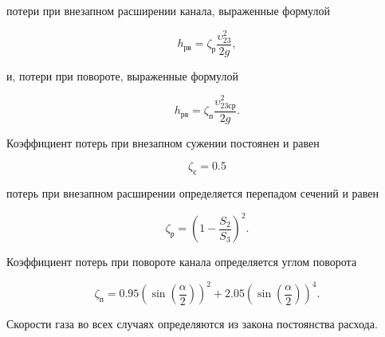 потери при внезапном расширении канала, выраженные формулой

\begin{equation}
    \label{eqn:ExpansionLosses}
    h_\text{рв}=\zeta_\text{р} \dfrac{\upsilon_{23}^2}{2g},
\end{equation}

и, потери при повороте, выраженные формулой

\begin{equation}
    \label{eqn:RotationLosses}
    h_\text{рв}=\zeta_\text{п} \dfrac{\upsilon_{23\text{ср}}^2}{2g}.
\end{equation}

Коэффициент потерь при внезапном сужении постоянен и равен

\begin{equation}
    \label{eqn:ConstrictionLossesCoef}
    \zeta_\text{с} = 0.5
\end{equation}

потерь при внезапном расширении определяется перепадом сечений и равен

\begin{equation}
    \label{eqn:ExpansionLossesCoef}
    \zeta_\text{р}=(1-\dfrac{S_{2}}{S_{3}})^2.
\end{equation}

Коэффициент потерь при повороте канала определяется углом поворота

\begin{equation}
    \label{eqn:RotationLossesCoef}
    \zeta_\text{п}=0.95 (\sin(\dfrac{\alpha}{2}))^2 + 2.05(\sin(\dfrac{\alpha}{2}))^4.
\end{equation}

Скорости газа во всех случаях определяются из закона постоянства расхода.

